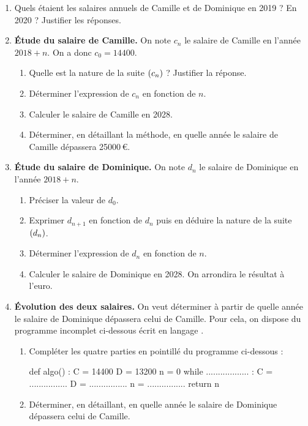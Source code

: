 \documentclass[a4paper,11pt]{article}
\begin{document}
\begin{enumerate}
	\item Quels étaient les salaires annuels de Camille et de Dominique en 2019 ? En 2020 ? Justifier les réponses.
	\item \textbf{Étude du salaire de Camille.} On note $c_n$ le salaire de Camille en l’année $2018+n$. On a donc $c_0 = \num{14400}$.
	\begin{enumerate}
		\item Quelle est la nature de la suite $\suiten[c]$ ? Justifier la réponse.
		\item Déterminer l'expression de $c_n$ en fonction de $n$. 
		\item Calculer le salaire de Camille en 2028.
		\item Déterminer, en détaillant la méthode, en quelle année le salaire de Camille dépassera \num{25000}\,€. 
	\end{enumerate}
	\item \textbf{Étude du salaire de Dominique.} On note $d_n$ le salaire de Dominique en l’année $2018+n$. 
	\begin{enumerate}
		\item Préciser la valeur de $d_0$.
		\item Exprimer $d_{n+1}$ en fonction de $d_n$ puis en déduire la nature de la suite $\suiten[d]$.
		\item Déterminer l'expression de $d_n$ en fonction de $n$.
		\item Calculer le salaire de Dominique en 2028. On arrondira le résultat à l’euro. 
	\end{enumerate}
	\item \textbf{Évolution des deux salaires.} On veut déterminer à partir de quelle année le salaire de Dominique dépassera celui de Camille. Pour cela, on dispose du programme incomplet ci-dessous écrit 
	en langage \calgpython.
	\begin{enumerate}
		\item Compléter les quatre parties en pointillé du programme ci-dessous : 
		\begin{envpython}[12cm]
			def algo() : 
				C = 14400
				D = 13200
				n = 0
				while .................. :
					C = ................
					D = ................
					n = ................
				return n
		\end{envpython}
		\item Déterminer, en détaillant, en quelle année le salaire de Dominique dépassera celui de Camille.
	\end{enumerate}

\end{enumerate}
\end{document}
